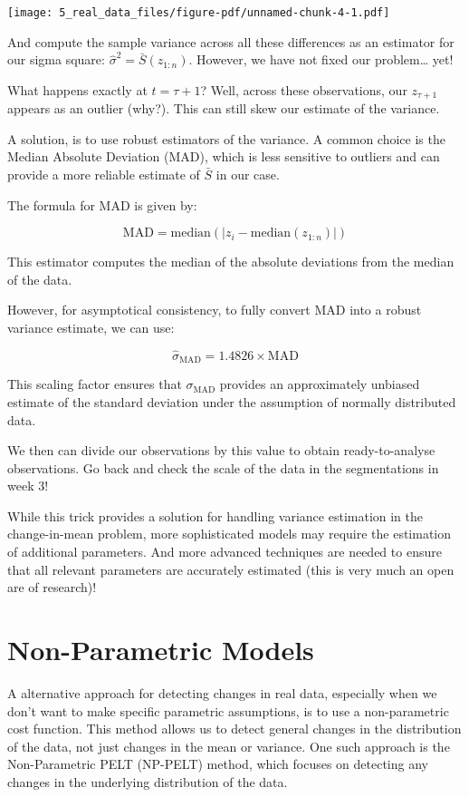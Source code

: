 \documentclass[
  letterpaper,
  DIV=11,
  numbers=noendperiod]{scrreprt}
\begin{document}
\texttt{[image: 5\_real\_data\_files/figure-pdf/unnamed-chunk-4-1.pdf]}

And compute the sample variance across all these differences as an
estimator for our sigma square: \(\hat \sigma^2 = \bar S(z_{1:n})\).
However, we have not fixed our problem\ldots{} yet!

What happens exactly at \(t = \tau +1\)? Well, across these
observations, our \(z_{\tau + 1}\) appears as an outlier (why?). This
can still skew our estimate of the variance.

A solution, is to use robust estimators of the variance. A common choice
is the Median Absolute Deviation (MAD), which is less sensitive to
outliers and can provide a more reliable estimate of \(\bar S\) in our
case.

The formula for MAD is given by:

\[
\text{MAD} = \text{median}(|z_i - \text{median}(z_{1:n})|)
\]

This estimator computes the median of the absolute deviations from the
median of the data.

However, for asymptotical consistency, to fully convert MAD into a
robust variance estimate, we can use:

\[
\hat \sigma_{\text{MAD}} = 1.4826 \times \text{MAD}
\]

This scaling factor ensures that \(\sigma_{\text{MAD}}\) provides an
approximately unbiased estimate of the standard deviation under the
assumption of normally distributed data.

We then can divide our observations by this value to obtain
ready-to-analyse observations. Go back and check the scale of the data
in the segmentations in week 3!

While this trick provides a solution for handling variance estimation in
the change-in-mean problem, more sophisticated models may require the
estimation of additional parameters. And more advanced techniques are
needed to ensure that all relevant parameters are accurately estimated
(this is very much an open are of research)!

\section{Non-Parametric Models}\label{non-parametric-models}

A alternative approach for detecting changes in real data, especially
when we don't want to make specific parametric assumptions, is to use a
non-parametric cost function. This method allows us to detect general
changes in the distribution of the data, not just changes in the mean or
variance. One such approach is the Non-Parametric PELT (NP-PELT) method,
which focuses on detecting any changes in the underlying distribution of
the data.
\end{document}
